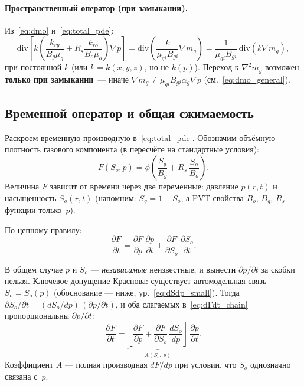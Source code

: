﻿\documentclass[12pt,a4paper]{article}
\begin{document}
\paragraph{Пространственный оператор (при замыкании).}
Из~\eqref{eq:dmo} и~\eqref{eq:total_pde}:
\begin{equation}\label{eq:rhs_multi}
  \mathrm{div}\left[k\left(\frac{k_{rg}}{B_g\mu_g}
  + R_s\frac{k_{ro}}{B_o\mu_o}\right)\nabla p\right]
  = \mathrm{div}\left(\frac{k}{\mu_{gi}B_{gi}}\nabla m_g\right)
  = \frac{1}{\mu_{gi}B_{gi}}\,\mathrm{div}(k\nabla m_g),
\end{equation}
при постоянной $k$ (или $k=k(x,y,z)$, но не $k(p)$).
Переход к $\nabla^2 m_g$ возможен \textbf{только при замыкании}~---
иначе $\nabla m_g \neq \mu_{gi}B_{gi}\alpha_g\nabla p$
(см.~\eqref{eq:dmo_general}).

\subsection{Временной оператор и общая сжимаемость}\label{ssec:multi_ct}

Раскроем временную производную в~\eqref{eq:total_pde}.
Обозначим объёмную плотность газового компонента
(в пересчёте на стандартные условия):
\begin{equation}\label{eq:F_def}
  F(S_o, p) = \phi\left(\frac{S_g}{B_g} + R_s\,\frac{S_o}{B_o}\right).
\end{equation}
Величина $F$ зависит от времени через две переменные:
давление $p(r,t)$ и насыщенность $S_o(r,t)$
(напомним: $S_g = 1 - S_o$, а PVT-свойства
$B_o$, $B_g$, $R_s$ --- функции только~$p$).

По цепному правилу:
\begin{equation}\label{eq:dFdt_chain}
  \frac{\partial F}{\partial t}
  = \frac{\partial F}{\partial p}\,\frac{\partial p}{\partial t}
  + \frac{\partial F}{\partial S_o}\,\frac{\partial S_o}{\partial t}.
\end{equation}

В общем случае $p$ и $S_o$ --- \emph{независимые} неизвестные,
и вынести $\partial p/\partial t$ за скобки нельзя.
Ключевое допущение Краснова: существует автомодельная связь
$S_o = S_o(p)$ (обоснование --- ниже,
ур.~\eqref{eq:dSdp_small}). Тогда
$\partial S_o/\partial t = (dS_o/dp)\,(\partial p/\partial t)$,
и оба слагаемых в~\eqref{eq:dFdt_chain} пропорциональны
$\partial p/\partial t$:
\begin{equation}\label{eq:A_def}
  \frac{\partial F}{\partial t}
  = \underbrace{\left[\frac{\partial F}{\partial p}
  + \frac{\partial F}{\partial S_o}\,\frac{dS_o}{dp}
  \right]}_{A(S_o,\,p)}\,\frac{\partial p}{\partial t}.
\end{equation}
Коэффициент $A$ --- полная производная $dF/dp$ при условии,
что $S_o$ однозначно связана с~$p$.
\end{document}
